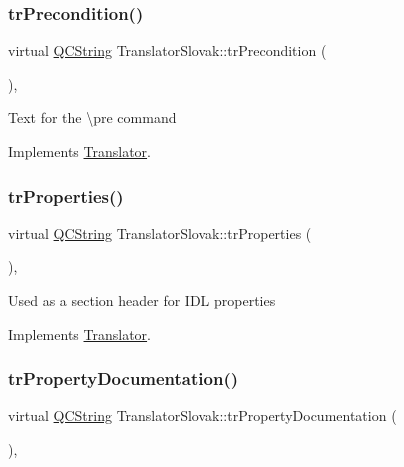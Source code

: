 \subsubsection{\texorpdfstring{trPrecondition()}{trPrecondition()}}
{\footnotesize\ttfamily virtual \mbox{\hyperlink{class_q_c_string}{Q\+C\+String}} Translator\+Slovak\+::tr\+Precondition (\begin{DoxyParamCaption}{ }\end{DoxyParamCaption})\hspace{0.3cm}{\ttfamily [inline]}, {\ttfamily [virtual]}}

Text for the \textbackslash{}pre command 

Implements \mbox{\hyperlink{class_translator}{Translator}}.

\mbox{\label{class_translator_slovak_ac249f8f7451c125081cd1a9bbb31473d}} 
\subsubsection{\texorpdfstring{trProperties()}{trProperties()}}
{\footnotesize\ttfamily virtual \mbox{\hyperlink{class_q_c_string}{Q\+C\+String}} Translator\+Slovak\+::tr\+Properties (\begin{DoxyParamCaption}{ }\end{DoxyParamCaption})\hspace{0.3cm}{\ttfamily [inline]}, {\ttfamily [virtual]}}

Used as a section header for I\+DL properties 

Implements \mbox{\hyperlink{class_translator}{Translator}}.

\mbox{\label{class_translator_slovak_a5d0bda1818e656b31c31964bb6d21d3e}} 
\subsubsection{\texorpdfstring{trPropertyDocumentation()}{trPropertyDocumentation()}}
{\footnotesize\ttfamily virtual \mbox{\hyperlink{class_q_c_string}{Q\+C\+String}} Translator\+Slovak\+::tr\+Property\+Documentation (\begin{DoxyParamCaption}{ }\end{DoxyParamCaption})\hspace{0.3cm}{\ttfamily [inline]}, {\ttfamily [virtual]}}

